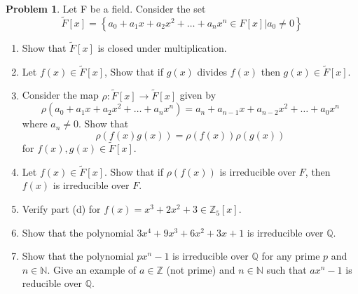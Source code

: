 \documentclass[10pt]{article}
\theoremstyle{definition}
\newtheorem{problem}{Problem}
\newcommand{\ti}[1]{\widetilde{#1}}
\begin{document}
\begin{problem}
Let F be a field. Consider the set
$$\ti{F}[x]=\left\{a_0+a_1x+a_2x^2+\dots+a_nx^n\in F[x]|a_0\neq 0\right\}$$
\begin{enumerate}[label=(\alph*)]
  \item Show that $\ti{F}[x]$ is closed under multiplication.
  \item Let $f(x)\in \ti{F}[x]$, Show that if $g(x)$ divides $f(x)$ then $g(x)\in \ti{F}[x]$.
  \item Consider the map $\rho: \ti{F}[x]\to \ti{F}[x]$ given by
        $$\rho(a_0+a_1x+a_2x^2+\dots+a_nx^n)=a_n+a_{n-1}x+a_{n-2}x^2+\dots+a_0x^n$$
        where $a_n\neq 0$. Show that $$\rho(f(x)g(x))=\rho(f(x))\rho(g(x))$$
        for $f(x),g(x)\in \ti{F}[x]$.
  \item Let $f(x)\in\ti{F}[x]$. Show that if $\rho(f(x))$ is irreducible over $F$, then $f(x)$ is irreducible over $F$.
  \item Verify part (d) for $f(x)=x^3+2x^2+3\in \mathbb{Z}_5[x]$.
  \item Show that the polynomial $3x^4 + 9x^3 + 6x^2 + 3x + 1$ is irreducible
        over $\mathbb{Q}$.
  \item Show that the polynomial $px^n -1$  is irreducible over $\mathbb{Q}$ for any
        prime $p$ and $n\in\mathbb{N}$. Give an example of $a\in\mathbb{Z}$ (not prime) and
        $n\in\mathbb{N}$ such that $ax^n - 1$ is reducible over $\mathbb{Q}$.
\end{enumerate}
\end{problem}
\end{document}
